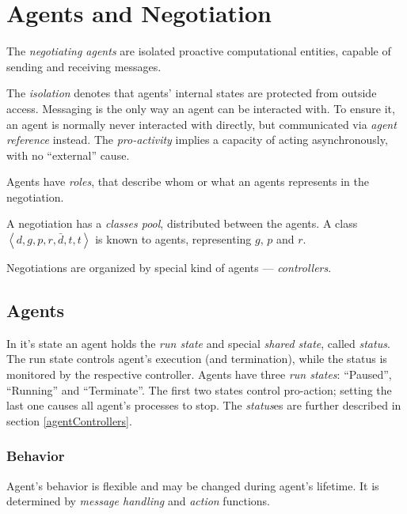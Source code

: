 %




\section{Agents and Negotiation}

The \emph{negotiating agents} are isolated proactive computational entities,
capable of sending and receiving messages.

The \emph{isolation} denotes that agents' internal states are protected
from outside access. Messaging is the only way an agent can be interacted with.
To ensure it, an agent is normally never interacted with directly, but
communicated via \emph{agent reference} instead.
The \emph{pro-activity} implies a capacity of acting asynchronously,
with no ``external'' cause.

Agents have \emph{roles}, that describe whom or what an agents represents
in the negotiation.

A negotiation has a \emph{classes pool}, distributed between the agents.
A class $\left< d, g, p, r, \bar d, t, t \right>$ is known to agents,
representing $g$, $p$ and $r$.

Negotiations are organized by special kind of agents --- \emph{controllers}.


\subsection{Agents}

In it's state an agent holds the \emph{run state} and special \emph{shared
  state}, called \emph{status}. The run state controls agent's execution
(and termination), while the status is monitored by the respective controller.
Agents have three \emph{run states}: ``Paused'', ``Running'' and ``Terminate''.
The first two states control pro-action; setting the last one causes all
agent's processes to stop. The \emph{status}es are further described in
section \ref{agentControllers}.

\subsubsection{Behavior}

Agent's behavior is flexible and may be changed during agent's lifetime.
It is determined by \emph{message handling} and \emph{action} functions.

